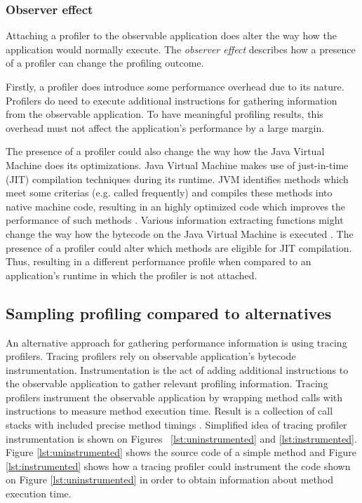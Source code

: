 \documentclass[..thesis.tex]{subfiles}
\begin{document}
\subsubsection{Observer effect}

Attaching a profiler to the observable application does alter the way how the application would normally execute. The \textit{observer effect} describes how a presence of a profiler can change the profiling outcome.
 
Firstly, a profiler does introduce some performance overhead due to its nature. Profilers do need to execute additional instructions for gathering information from the observable application. To have meaningful profiling results, this overhead must not affect the application's performance by a large margin.


The presence of a profiler could also change the way how the Java Virtual Machine does its optimizations. Java Virtual Machine makes use of just-in-time (JIT) compilation techniques during its runtime. JVM identifies methods which meet some criterias (e.g. called frequently) and compiles these methods into native machine code, resulting in an highly optimized code which improves the performance of such methods \cite{understanding_jit}. Various information extracting functions might change the way how the bytecode on the Java Virtual Machine is executed \cite{mytkowicz_evaluating_2010}. The presence of a profiler could alter which methods are eligible for JIT compilation. Thus, resulting in a different performance profile when compared to an application's runtime in which the profiler is not attached.


\subsection{Sampling profiling compared to alternatives}

An alternative approach for gathering performance information is using tracing profilers. Tracing profilers rely on observable application's bytecode instrumentation. Instrumentation is the act of adding additional instructions to the observable application to gather relevant profiling information. Tracing profilers instrument the observable application by wrapping method calls with instructions to measure method execution time. Result is a collection of call stacks with included precise method timings \cite{whitham_jack}. Simplified idea of tracing profiler instrumentation is shown on Figures ~\ref{lst:uninstrumented} and \ref{lst:instrumented}. Figure \ref{lst:uninstrumented} shows the source code of a simple method and Figure \ref{lst:instrumented} shows how a tracing profiler could instrument the code shown on Figure \ref{lst:uninstrumented} in order to obtain information about method execution time.
\end{document}
